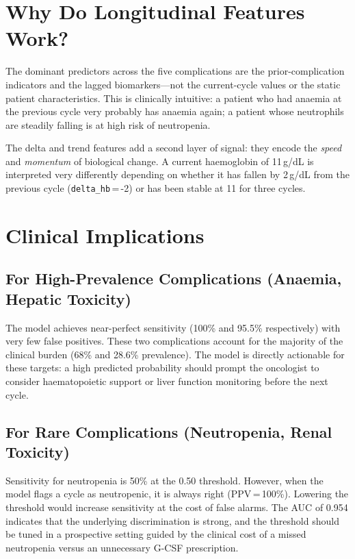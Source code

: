 \documentclass[12pt,a4paper]{report}
\begin{document}
\section{Why Do Longitudinal Features Work?}

The dominant predictors across the five complications are the prior-complication indicators and the lagged biomarkers---not the current-cycle values or the static patient characteristics. This is clinically intuitive: a patient who had anaemia at the previous cycle very probably has anaemia again; a patient whose neutrophils are steadily falling is at high risk of neutropenia.

The delta and trend features add a second layer of signal: they encode the \emph{speed} and \emph{momentum} of biological change. A current haemoglobin of 11\,g/dL is interpreted very differently depending on whether it has fallen by 2\,g/dL from the previous cycle (\texttt{delta\_hb}\,=\,-2) or has been stable at 11 for three cycles.

\section{Clinical Implications}

\subsection{For High-Prevalence Complications (Anaemia, Hepatic Toxicity)}
The model achieves near-perfect sensitivity (100\% and 95.5\% respectively) with very few false positives. These two complications account for the majority of the clinical burden (68\% and 28.6\% prevalence). The model is directly actionable for these targets: a high predicted probability should prompt the oncologist to consider haematopoietic support or liver function monitoring before the next cycle.

\subsection{For Rare Complications (Neutropenia, Renal Toxicity)}
Sensitivity for neutropenia is 50\% at the 0.50 threshold. However, when the model flags a cycle as neutropenic, it is always right (PPV\,=\,100\%). Lowering the threshold would increase sensitivity at the cost of false alarms. The AUC of 0.954 indicates that the underlying discrimination is strong, and the threshold should be tuned in a prospective setting guided by the clinical cost of a missed neutropenia versus an unnecessary G-CSF prescription.
\end{document}
